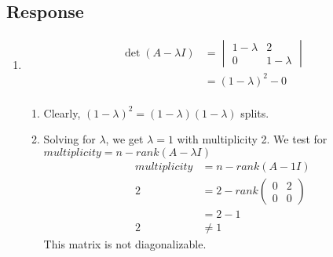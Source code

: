 \documentclass[13pt]{article}
\begin{document}
\subsection*{Response}
\begin{enumerate}[label=(\alph*),leftmargin=*]
\item
  \begin{align*}
    \det(A - \lambda I) &=
                          \begin{vmatrix}
                            1 - \lambda & 2 \\
                            0 & 1 - \lambda
                          \end{vmatrix} \\
                        &= (1 - \lambda)^2 - 0 \\
  \end{align*}
  \begin{enumerate}
  \item Clearly, $(1 - \lambda)^2 = (1 - \lambda)(1 - \lambda)$ splits.
  \item Solving for $\lambda$, we get $\lambda = 1$ with multiplicity 2. We test for $multiplicity = n - rank(A - \lambda I)$
    \begin{align*}
      multiplicity &= n - rank(A - 1I) \\
      2 &= 2 - rank
          \begin{pmatrix}
            0 & 2 \\
            0 & 0
          \end{pmatrix} \\
                   &= 2 - 1 \\
      2 &\neq 1      
    \end{align*}
    This matrix is not diagonalizable.
  \end{enumerate}


\end{enumerate}
\end{document}
